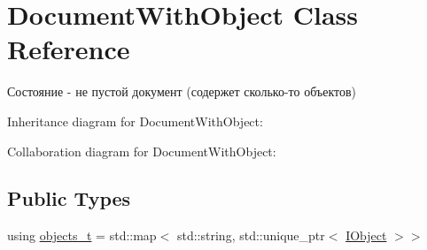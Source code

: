 \hypertarget{class_document_with_object}{}\section{Document\+With\+Object Class Reference}
\label{class_document_with_object}


Состояние -\/ не пустой документ (содержет сколько-\/то объектов)  




Inheritance diagram for Document\+With\+Object\+:


Collaboration diagram for Document\+With\+Object\+:
\subsection*{Public Types}
\begin{DoxyCompactItemize}
\item 
using \hyperlink{class_document_with_object_a955b8e449e2c7a393594163f3a122770}{objects\+\_\+t} = std\+::map$<$ std\+::string, std\+::unique\+\_\+ptr$<$ \hyperlink{struct_i_object}{I\+Object} $>$$>$
\end{DoxyCompactItemize}

